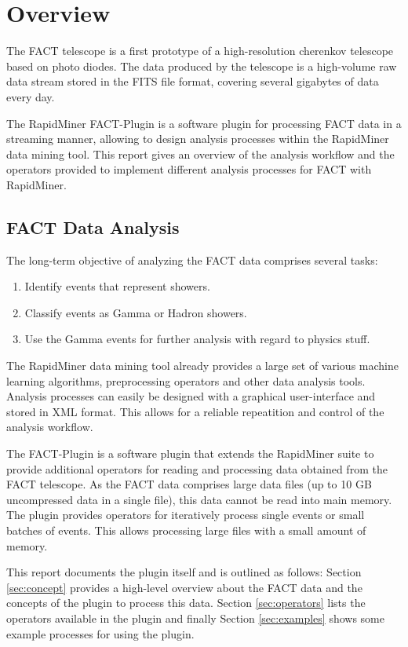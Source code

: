 \section{Overview}


The FACT telescope is a first prototype of a high-resolution cherenkov
telescope based on photo diodes. The data produced by the telescope is
a high-volume raw data stream stored in the FITS file format, covering
several gigabytes of data every day.

The RapidMiner FACT-Plugin is a software plugin for processing FACT
data in a streaming manner, allowing to design analysis processes
within the RapidMiner data mining tool. This report gives an overview
of the analysis workflow and the operators provided to implement
different analysis processes for FACT with RapidMiner.




\subsection*{FACT Data Analysis}
The long-term objective of analyzing the FACT data comprises several tasks:
\begin{enumerate}
  \item Identify events that represent showers.
  \item Classify events as Gamma or Hadron showers.
  \item Use the Gamma events for further analysis with regard to physics stuff.
\end{enumerate}

The RapidMiner data mining tool already provides a large set of
various machine learning algorithms, preprocessing operators and other
data analysis tools. Analysis processes can easily be designed with a
graphical user-interface and stored in XML format. This allows for a
reliable repeatition and control of the analysis workflow.

The FACT-Plugin is a software plugin that extends the RapidMiner suite
to provide additional operators for reading and processing data
obtained from the FACT telescope. As the FACT data comprises large
data files (up to 10 GB uncompressed data in a single file), this data
cannot be read into main memory. The plugin provides operators for
iteratively process single events or small batches of events. This
allows processing large files with a small amount of memory.

This report documents the plugin itself and is outlined as follows:
Section \ref{sec:concept} provides a high-level overview about the
FACT data and the concepts of the plugin to process this data. Section
\ref{sec:operators} lists the operators available in the plugin and
finally Section \ref{sec:examples} shows some example processes for
using the plugin.





